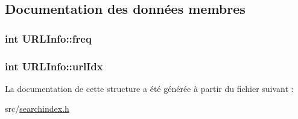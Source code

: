 \subsection{Documentation des données membres}
\hypertarget{struct_u_r_l_info_ab1d13a58a5c2b07d75085d5dc9f20e16}{}
\subsubsection[{freq}]{\setlength{\rightskip}{0pt plus 5cm}int U\+R\+L\+Info\+::freq}\label{struct_u_r_l_info_ab1d13a58a5c2b07d75085d5dc9f20e16}
\hypertarget{struct_u_r_l_info_a78677139b775339dc20c3bb47f2f7a03}{}
\subsubsection[{url\+Idx}]{\setlength{\rightskip}{0pt plus 5cm}int U\+R\+L\+Info\+::url\+Idx}\label{struct_u_r_l_info_a78677139b775339dc20c3bb47f2f7a03}


La documentation de cette structure a été générée à partir du fichier suivant \+:\begin{DoxyCompactItemize}
\item 
src/\hyperlink{searchindex_8h}{searchindex.\+h}\end{DoxyCompactItemize}
